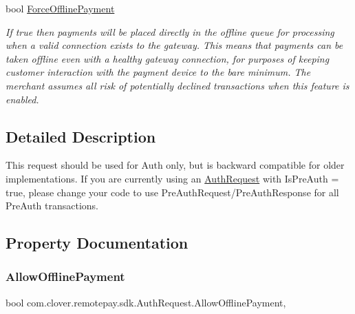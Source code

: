 \begin{DoxyCompactItemize}
bool \hyperlink{classcom_1_1clover_1_1remotepay_1_1sdk_1_1_auth_request_ae60bb0644551b7c845472bfcef226de4}{Force\+Offline\+Payment}
\begin{DoxyCompactList}\small\item\em If true then payments will be placed directly in the offline queue for processing when a valid connection exists to the gateway. This means that payments can be taken offline even with a healthy gateway connection, for purposes of keeping customer interaction with the payment device to the bare minimum. The merchant assumes all risk of potentially declined transactions when this feature is enabled. \end{DoxyCompactList}\end{DoxyCompactItemize}


\subsection{Detailed Description}
This request should be used for Auth only, but is backward compatible for older implementations. If you are currently using an \hyperlink{classcom_1_1clover_1_1remotepay_1_1sdk_1_1_auth_request}{Auth\+Request} with Is\+Pre\+Auth = true, please change your code to use Pre\+Auth\+Request/\+Pre\+Auth\+Response for all Pre\+Auth transactions. 



\subsection{Property Documentation}
\mbox{\label{classcom_1_1clover_1_1remotepay_1_1sdk_1_1_auth_request_afaafa0e18fed556cc3cd6ca9906630b2}} 
\subsubsection{\texorpdfstring{Allow\+Offline\+Payment}{AllowOfflinePayment}}
{\footnotesize\ttfamily bool com.\+clover.\+remotepay.\+sdk.\+Auth\+Request.\+Allow\+Offline\+Payment\hspace{0.3cm}{\ttfamily [get]}, {\ttfamily [set]}}




